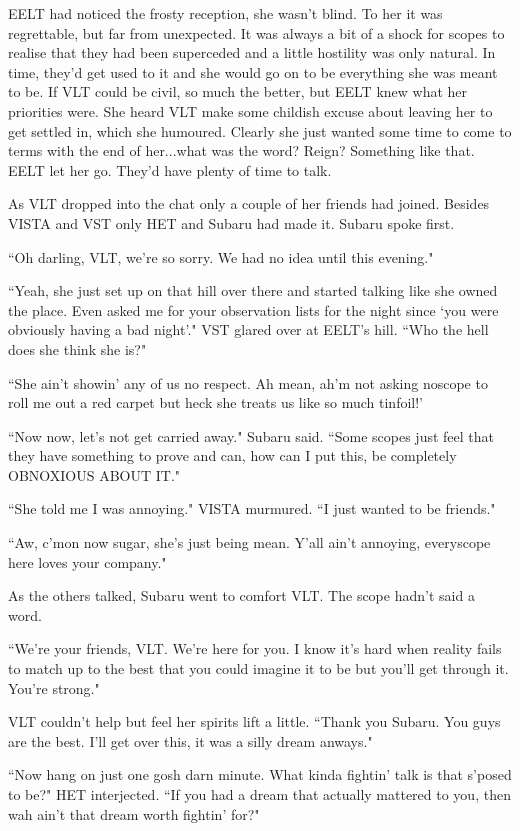 \documentclass[12pt]{iopart}
\begin{document}
EELT had noticed the frosty reception, she wasn't blind. To her it was regrettable, but far from unexpected. It was always a bit of a shock for scopes to realise that they had been superceded and a little hostility was only natural. In time, they'd get used to it and she would go on to be everything she was meant to be. If VLT could be civil, so much the better, but EELT knew what her priorities were. She heard VLT make some childish excuse about leaving her to get settled in, which she humoured. Clearly she just wanted some time to come to terms with the end of her...what was the word? Reign? Something like that. EELT let her go. They'd have plenty of time to talk.

As VLT dropped into the chat only a couple of her friends had joined. Besides VISTA and VST only HET and Subaru had made it. Subaru spoke first.

``Oh darling, VLT, we're so sorry. We had no idea until this evening."

``Yeah, she just set up on that hill over there and started talking like she owned the place. Even asked me for your observation lists for the night since `you were obviously having a bad night'." VST glared over at EELT's hill. ``Who the hell does she think she is?"

``She ain't showin' any of us no respect. Ah mean, ah'm not asking noscope to roll me out a red carpet but heck she treats us like so much tinfoil!'

``Now now, let's not get carried away." Subaru said. ``Some scopes just feel that they have something to prove and can, how can I put this, be completely OBNOXIOUS ABOUT IT."

``She told me I was annoying." VISTA murmured. ``I just wanted to be friends."

``Aw, c'mon now sugar, she's just being mean. Y'all ain't annoying, everyscope here loves your company."

As the others talked, Subaru went to comfort VLT. The scope hadn't said a word.

``We're your friends, VLT. We're here for you. I know it's hard when reality fails to match up to the best that you could imagine it to be but you'll get through it. You're strong."

VLT couldn't help but feel her spirits lift a little. ``Thank you Subaru. You guys are the best. I'll get over this, it was a silly dream anways."

``Now hang on just one gosh darn minute. What kinda fightin' talk is that s'posed to be?" HET interjected. ``If you had a dream that actually mattered to you, then wah ain't that dream worth fightin' for?"
\end{document}
